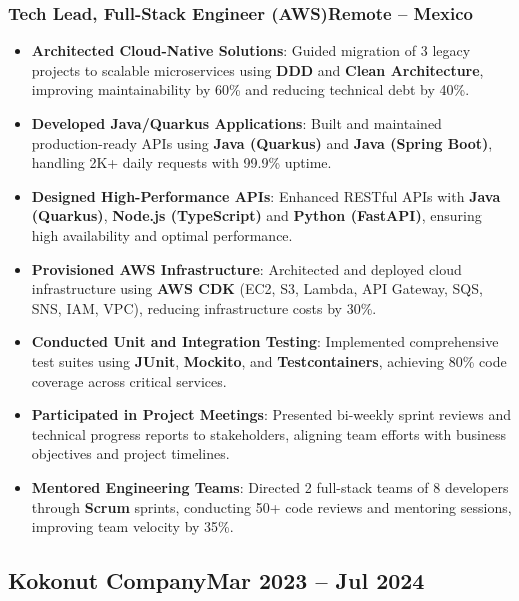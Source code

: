 \documentclass[a4paper,10pt]{article}
\newcommand{\kw}[1]{\textbf{\textcolor{keyword}{#1}}}
\newcommand{\tech}[1]{\textbf{\textcolor{tech}{#1}}}
\begin{document}
\subsubsection*{\small Tech Lead, Full-Stack Engineer (AWS)\hfill Remote -- Mexico}
\begin{itemize}[noitemsep, leftmargin=*]
    \item \textbf{Architected Cloud-Native Solutions}: Guided migration of 3 legacy projects to scalable microservices using \kw{DDD} and \kw{Clean Architecture}, improving maintainability by 60\% and reducing technical debt by 40\%.
    \item \textbf{Developed Java/Quarkus Applications}: Built and maintained production-ready APIs using \tech{Java (Quarkus)} and \tech{Java (Spring Boot)}, handling 2K+ daily requests with 99.9\% uptime.
    \item \textbf{Designed High-Performance APIs}: Enhanced RESTful APIs with \tech{Java (Quarkus)}, \tech{Node.js (TypeScript)} and \tech{Python (FastAPI)}, ensuring high availability and optimal performance.
    \item \textbf{Provisioned AWS Infrastructure}: Architected and deployed cloud infrastructure using \tech{AWS CDK} (EC2, S3, Lambda, API Gateway, SQS, SNS, IAM, VPC), reducing infrastructure costs by 30\%.
    \item \textbf{Conducted Unit and Integration Testing}: Implemented comprehensive test suites using \tech{JUnit}, \tech{Mockito}, and \tech{Testcontainers}, achieving 80\% code coverage across critical services.
    \item \textbf{Participated in Project Meetings}: Presented bi-weekly sprint reviews and technical progress reports to stakeholders, aligning team efforts with business objectives and project timelines.
    \item \textbf{Mentored Engineering Teams}: Directed 2 full-stack teams of 8 developers through \kw{Scrum} sprints, conducting 50+ code reviews and mentoring sessions, improving team velocity by 35\%.
\end{itemize}

\subsection*{\small Kokonut Company\hfill\textbf{Mar 2023 -- Jul 2024}}
\end{document}
